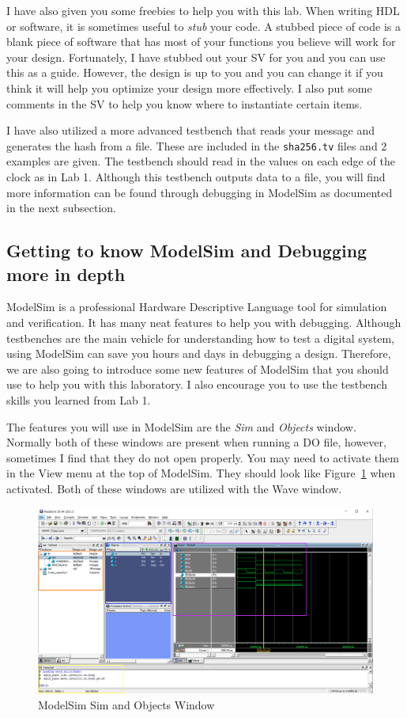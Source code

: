 \documentclass{article}
\begin{document}
I have also given you some freebies to help you with this lab.  When
writing HDL or software, it is sometimes useful to \textit{stub} your
code.  A stubbed piece of code is a blank piece of software that has
most of your functions you believe will work for your design.
Fortunately, I have stubbed out your SV for you and you can use this
as a guide.  However, the design is up to you and you can change it if
you think it will help you optimize your design more effectively.
I also put some comments in the SV to help you know where
to instantiate certain items.

I have also utilized a more advanced testbench that reads your
message and generates the hash from a file.  These are included in the
\verb!sha256.tv! files and $2$ examples are given.  The testbench should
read in the values on each edge of the clock as in Lab 1.  Although
this testbench outputs data to a file, you will find more information
can be found through debugging in ModelSim as documented in the next
subsection.

\subsection{Getting to know ModelSim and Debugging more in depth}

ModelSim is a professional Hardware Descriptive Language tool for
simulation and verification.  It has many neat features to help you
with debugging.  Although testbenches are the main vehicle for
understanding how to test a digital system, using ModelSim can save
you hours and days in debugging a design.  Therefore, we are also
going to introduce some new features of ModelSim that you should use
to help you with this laboratory. I also encourage you to use the
testbench skills you learned from Lab 1.

The features you will use in ModelSim are the \textit{Sim} and
\textit{Objects} window.  Normally both of these windows are present
when running a DO file, however, sometimes I find that they do not
open properly.  You may need to activate them in the View menu at the
top of ModelSim.  They should look like Figure~\ref{modelsim.png} when
activated.  Both of these windows are utilized with the Wave window.
\begin{figure} [t!]
  \centering
  \includegraphics[scale=0.3]{modelsim.png}
  \caption{ModelSim Sim and Objects Window}
  \label{modelsim.png}
\end{figure}
\end{document}
